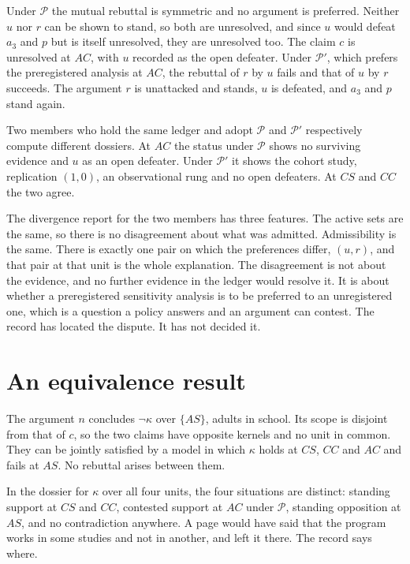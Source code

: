 \documentclass[11pt]{article}
\newcommand{\nk}[1]{\neg #1}
\begin{document}
Under $\mathcal P$ the mutual rebuttal is symmetric and no argument is preferred. Neither $u$ nor $r$ can be shown to stand, so both are unresolved, and since $u$ would defeat $a_3$ and $p$ but is itself unresolved, they are unresolved too. The claim $c$ is unresolved at $AC$, with $u$ recorded as the open defeater. Under $\mathcal P'$, which prefers the preregistered analysis at $AC$, the rebuttal of $r$ by $u$ fails and that of $u$ by $r$ succeeds. The argument $r$ is unattacked and stands, $u$ is defeated, and $a_3$ and $p$ stand again.

Two members who hold the same ledger and adopt $\mathcal P$ and $\mathcal P'$ respectively compute different dossiers. At $AC$ the status under $\mathcal P$ shows no surviving evidence and $u$ as an open defeater. Under $\mathcal P'$ it shows the cohort study, replication $(1,0)$, an observational rung and no open defeaters. At $CS$ and $CC$ the two agree.

The divergence report for the two members has three features. The active sets are the same, so there is no disagreement about what was admitted. Admissibility is the same. There is exactly one pair on which the preferences differ, $(u,r)$, and that pair at that unit is the whole explanation. The disagreement is not about the evidence, and no further evidence in the ledger would resolve it. It is about whether a preregistered sensitivity analysis is to be preferred to an unregistered one, which is a question a policy answers and an argument can contest. The record has located the dispute. It has not decided it.

\section{An equivalence result}\label{sec:equivalence}

The argument $n$ concludes $\nk\kappa$ over $\{AS\}$, adults in school. Its scope is disjoint from that of $c$, so the two claims have opposite kernels and no unit in common. They can be jointly satisfied by a model in which $\kappa$ holds at $CS$, $CC$ and $AC$ and fails at $AS$. No rebuttal arises between them.

In the dossier for $\kappa$ over all four units, the four situations are distinct: standing support at $CS$ and $CC$, contested support at $AC$ under $\mathcal P$, standing opposition at $AS$, and no contradiction anywhere. A page would have said that the program works in some studies and not in another, and left it there. The record says where.
\end{document}
